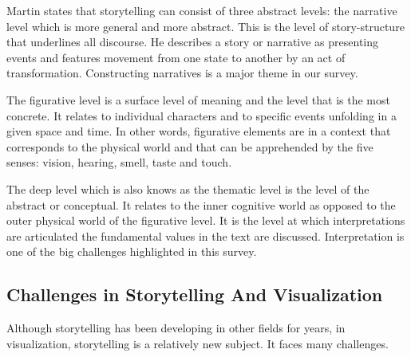 \documentclass{egpubl}
\begin{document}
Martin\cite{Martin1997} states that storytelling can consist of three abstract levels: the narrative level which is more general and more abstract. This is the level of story-structure that underlines all discourse. He describes a story or narrative as presenting events and features movement from one state to another by an act of transformation. Constructing narratives is a major theme in our survey.

The figurative level is a surface level of meaning and the level that is the most concrete. It relates to individual characters and to specific events unfolding in a given space and time. In other words, figurative elements are in a context that corresponds to the physical world and that can be apprehended by the five senses: vision, hearing, smell, taste and touch.

The deep level which is also knows as the thematic level is the level of the abstract or conceptual. It relates to the inner cognitive world as opposed to the outer physical world of the figurative level. It is the level at which interpretations are articulated the fundamental values in the text are discussed. Interpretation is one of the big challenges highlighted in this survey.

\subsection{Challenges in Storytelling And Visualization}
Although storytelling has been developing in other fields for years, in visualization, storytelling is a relatively new subject. It faces many challenges.
\end{document}
